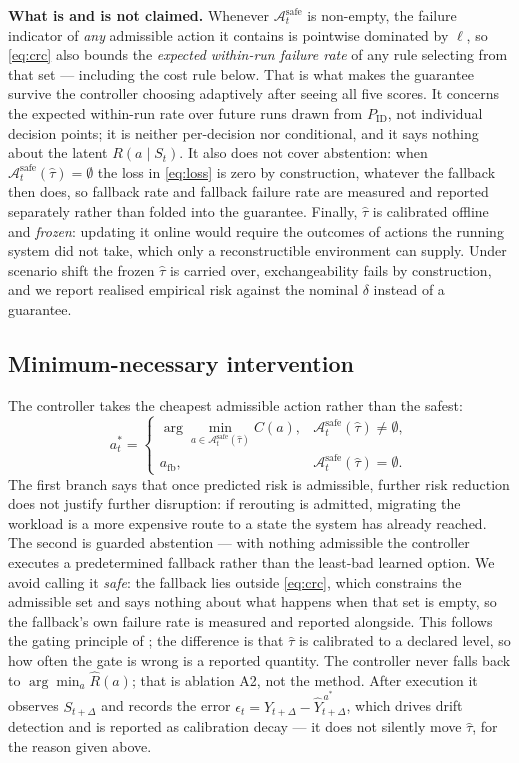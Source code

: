 \documentclass[journal]{IEEEtran}
\newcommand{\Aset}{\mathcal{A}}
\newcommand{\Asafe}{\Aset^{\mathrm{safe}}_{t}}
\begin{document}
\textbf{What is and is not claimed.} Whenever $\Asafe$ is non-empty, the failure
indicator of \emph{any} admissible action it contains is pointwise dominated by
$\ell$, so \eqref{eq:crc} also bounds the \emph{expected within-run failure
rate} of any rule selecting from that set --- including the cost rule below.
That is what makes the guarantee survive the controller choosing adaptively
after seeing all five scores. It concerns the expected within-run rate over
future runs drawn from $P_{\mathrm{ID}}$, not individual decision points; it is
neither per-decision nor conditional, and it says nothing about the latent
$R(a\mid S_t)$. It also does not cover abstention: when
$\Asafe(\hat\tau)=\emptyset$ the loss in \eqref{eq:loss} is zero by
construction, whatever the fallback then does, so fallback rate and fallback
failure rate are measured and reported separately rather than folded into the
guarantee. Finally, $\hat\tau$ is calibrated offline and \emph{frozen}: updating
it online would require the outcomes of actions the running system did not take,
which only a reconstructible environment can supply. Under scenario shift the
frozen $\hat\tau$ is carried over, exchangeability fails by construction, and we
report realised empirical risk against the nominal $\delta$ instead of a
guarantee.

\subsection{Minimum-necessary intervention}
The controller takes the cheapest admissible action rather than the safest:
\begin{equation}
a^{*}_t=
\begin{cases}
\displaystyle\arg\min_{a\in\Asafe(\hat\tau)} C(a), & \Asafe(\hat\tau)\neq\emptyset,\\[6pt]
a_{\mathrm{fb}}, & \Asafe(\hat\tau)=\emptyset .
\end{cases}
\label{eq:mni}
\end{equation}
The first branch says that once predicted risk is admissible, further risk
reduction does not justify further disruption: if rerouting is admitted,
migrating the workload is a more expensive route to a state the system has
already reached. The second is guarded abstention --- with nothing admissible the controller
executes a predetermined fallback rather than the least-bad learned option. We
avoid calling it \emph{safe}: the fallback lies outside \eqref{eq:crc}, which
constrains the admissible set and says nothing about what happens when that set
is empty, so the fallback's own failure rate is measured and reported alongside. This follows the gating principle of \cite{desilva2026aurora}; the
difference is that $\hat\tau$ is calibrated to a declared level, so how often
the gate is wrong is a reported quantity. The controller never falls back to
$\arg\min_a \hat{R}(a)$; that is ablation A2, not the method. After execution it
observes $S_{t+\Delta}$ and records the error
$\epsilon_t=Y_{t+\Delta}-\hat{Y}^{\,a^{*}}_{t+\Delta}$, which drives drift
detection and is reported as calibration decay --- it does not silently move
$\hat\tau$, for the reason given above.
\end{document}
